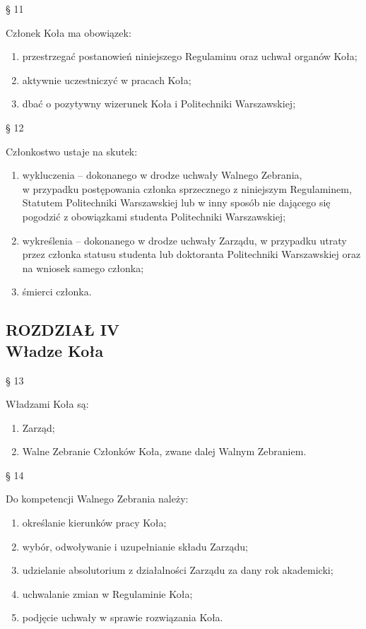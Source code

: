 \documentclass[a4paper,11pt]{article}
\renewcommand{\paragraph}[1] {\begin{center}§ {#1}\end{center}}
\newcommand{\content}[1] {\begin{flushleft}{#1}\end{flushleft}}
\newcommand{\chapter}[2] {\begin{center}\section*{ROZDZIAŁ {#1} \\ {#2}}\end{center}}
\begin{document}
\paragraph{11}
\content{Członek Koła ma obowiązek:}

\begin{enumerate}
	\item przestrzegać postanowień niniejszego Regulaminu oraz uchwał organów Koła;
	\item aktywnie uczestniczyć w pracach Koła;
	\item dbać o pozytywny wizerunek Koła i Politechniki Warszawskiej;
\end{enumerate}

\paragraph{12}
\content{Członkostwo ustaje na skutek:}
\begin{enumerate}
	\item wykluczenia  –  dokonanego  w  drodze  uchwały  Walnego  Zebrania,  \\ w  przypadku
postępowania  członka  sprzecznego  z  niniejszym  Regulaminem,  Statutem  Politechniki
Warszawskiej  lub w  inny sposób nie  dającego się  pogodzić z  obowiązkami  studenta
Politechniki Warszawskiej;
	\item wykreślenia – dokonanego w drodze uchwały Zarządu, w przypadku utraty przez członka
statusu  studenta  lub  doktoranta  Politechniki  Warszawskiej  oraz  na  wniosek  samego
członka;
	\item śmierci członka.
\end{enumerate}

\chapter{IV}{Władze Koła}

\paragraph{13}
\content{Władzami Koła są:}
\begin{enumerate}
	\item Zarząd;
	\item Walne Zebranie Członków Koła, zwane dalej Walnym Zebraniem.
\end{enumerate}

\paragraph{14}
\content{Do kompetencji Walnego Zebrania należy:}
\begin{enumerate}
	\item określanie kierunków pracy Koła;
	\item wybór, odwoływanie i uzupełnianie składu Zarządu;
	\item udzielanie absolutorium z działalności Zarządu za dany rok akademicki;
	\item uchwalanie zmian w Regulaminie Koła;
	\item podjęcie uchwały w sprawie rozwiązania Koła.
\end{enumerate}
\end{document}
